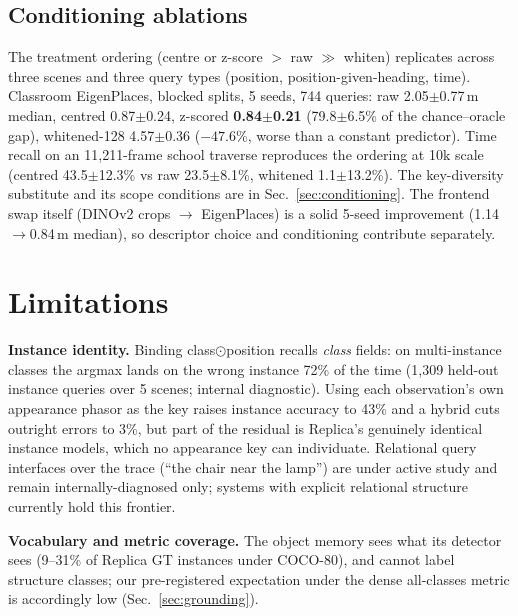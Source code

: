 \documentclass[conference]{IEEEtran}
\newcommand{\bnd}{\odot}
\begin{document}
\subsection{Conditioning ablations}
\label{sec:ablations}

The treatment ordering (centre or z-score $>$ raw $\gg$ whiten)
replicates across three scenes and three query types (position,
position-given-heading, time). Classroom EigenPlaces, blocked splits, 5
seeds, 744 queries:
raw 2.05$\pm$0.77\,m median, centred
0.87$\pm$0.24, z-scored \textbf{0.84$\pm$0.21} (79.8$\pm$6.5\% of the
chance--oracle gap), whitened-128 4.57$\pm$0.36 ($-47.6\%$, worse than
a constant predictor). Time recall on an 11{,}211-frame school traverse
reproduces the ordering at 10k scale (centred 43.5$\pm$12.3\% vs raw
23.5$\pm$8.1\%, whitened 1.1$\pm$13.2\%). The key-diversity substitute
and its scope conditions are in Sec.~\ref{sec:conditioning}. The
frontend swap itself (DINOv2 crops $\to$ EigenPlaces) is a solid 5-seed
improvement (1.14$\to$0.84\,m median), so descriptor choice and
conditioning contribute separately.

\section{Limitations}
\label{sec:limitations}

\textbf{Instance identity.} Binding class$\bnd$position recalls
\emph{class} fields: on multi-instance classes the argmax lands on the
wrong instance 72\% of the time (1{,}309 held-out instance queries over 5
scenes; internal diagnostic). Using each observation's own appearance
phasor as the key raises instance accuracy to 43\% and a hybrid cuts
outright errors to 3\%, but part of the residual is Replica's genuinely
identical instance models, which no appearance key can individuate.
Relational query interfaces over the trace (``the chair near the lamp'')
are under active study and remain internally-diagnosed only; systems with
explicit relational structure \cite{farm2026} currently hold this
frontier.

\textbf{Vocabulary and metric coverage.} The object memory sees what its
detector sees (9--31\% of Replica GT instances under COCO-80), and cannot
label structure classes; our pre-registered expectation under the
dense all-classes metric is accordingly low
(Sec.~\ref{sec:grounding}).
\end{document}
